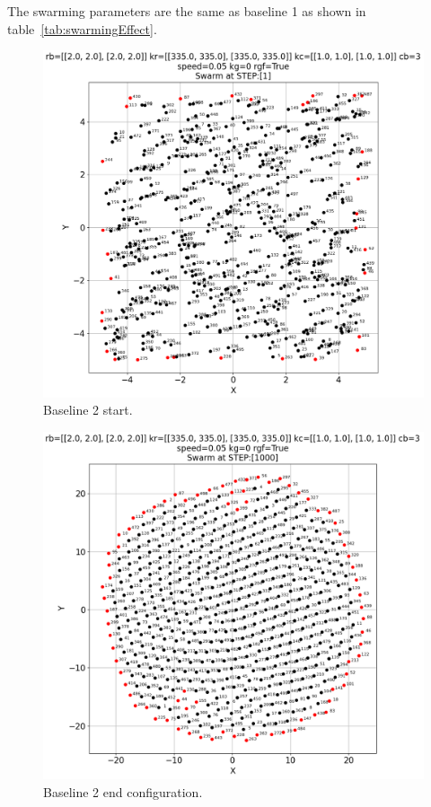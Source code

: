 \documentclass[12pt,a4paper]{IEEEtran}
\begin{document}
The swarming parameters are the same as baseline 1 as shown in table~\ref{tab:swarmingEffect}.
\begin{figure}[H]
	\begin{center}
		\includegraphics[width=1.0\linewidth]{figures/baseline2-1}
	\end{center}
	\caption{Baseline 2 start. \label{fig:baseline2}}
\end{figure}

\begin{figure}[H]
	\begin{center}
		\includegraphics[width=1.0\linewidth]{figures/baseline2-2}
	\end{center}
	\caption{Baseline 2 end configuration. \label{fig:baseline2-2}}
\end{figure}
\end{document}

